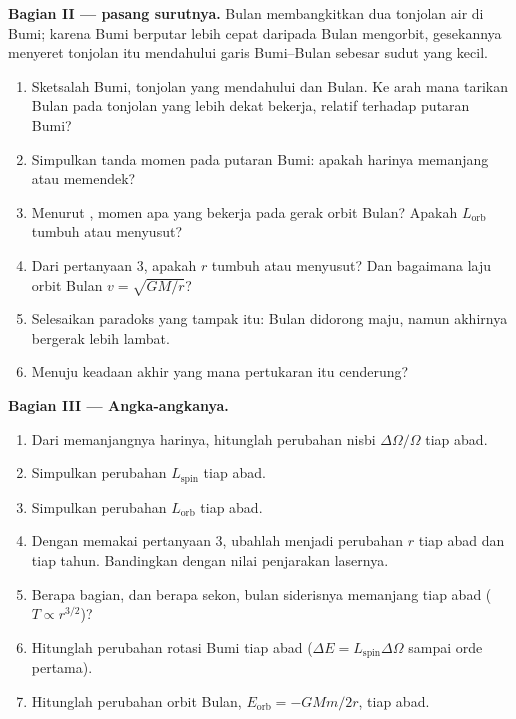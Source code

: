 \begin{problem}
\medskip
\noindent\textbf{Bagian II ---  pasang surutnya.}
Bulan membangkitkan dua tonjolan air di Bumi; karena Bumi berputar lebih
cepat daripada Bulan mengorbit, gesekannya menyeret tonjolan itu
mendahului garis Bumi--Bulan sebesar sudut yang kecil.
\begin{enumerate}[resume]
  \item Sketsalah Bumi, tonjolan yang mendahului dan Bulan. Ke arah mana
        tarikan Bulan pada tonjolan yang lebih dekat bekerja, relatif
        terhadap putaran Bumi?
  \item Simpulkan tanda momen pada putaran Bumi: apakah harinya
        memanjang atau memendek?
  \item Menurut , momen apa yang bekerja pada gerak orbit
        Bulan? Apakah $L_{\text{orb}}$ tumbuh atau menyusut?
  \item Dari pertanyaan 3, apakah $r$ tumbuh atau menyusut? Dan
        bagaimana laju orbit Bulan $v = \sqrt{GM/r}$?
  \item Selesaikan paradoks yang tampak itu: Bulan didorong maju, namun
        akhirnya bergerak lebih lambat.
  \item Menuju keadaan akhir yang mana pertukaran itu cenderung?
\end{enumerate}

\medskip
\noindent\textbf{Bagian III --- Angka-angkanya.}
\begin{enumerate}[resume]
  \item Dari memanjangnya harinya, hitunglah perubahan nisbi
        $\Delta\Omega/\Omega$ tiap abad.
  \item Simpulkan perubahan $L_{\text{spin}}$ tiap abad.
  \item Simpulkan perubahan $L_{\text{orb}}$ tiap abad.
  \item Dengan memakai pertanyaan 3, ubahlah menjadi perubahan $r$ tiap
        abad dan tiap tahun. Bandingkan dengan nilai penjarakan lasernya.
  \item Berapa bagian, dan berapa sekon, bulan siderisnya memanjang tiap
        abad ($T \propto r^{3/2}$)?
  \item Hitunglah perubahan  rotasi Bumi tiap abad
        ($\Delta E = L_{\text{spin}}\Delta\Omega$ sampai orde pertama).
  \item Hitunglah perubahan  orbit Bulan,
        $E_{\text{orb}} = -GMm/2r$, tiap abad.
\end{enumerate}


\end{problem}
